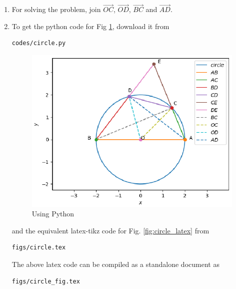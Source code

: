 \begin{enumerate}[label=\thesection.\arabic*.,ref=\thesection.\theenumi]
%
%
\item For solving the problem, join $\vec{OC}$, $\vec{OD}$, $\vec{BC}$ and $\vec{AD}$.
\item To get the python code for Fig \ref{fig:circle_python}, download it from
\begin{lstlisting}
codes/circle.py
\end{lstlisting}
\begin{figure}[!ht]
\centering
\includegraphics[width= \columnwidth]{Figure_1.eps}
\caption{Using Python}
\label{fig:circle_python}
\end{figure}
%
and the equivalent latex-tikz code for Fig. \ref{fig:circle_latex} from
\begin{lstlisting}
figs/circle.tex
\end{lstlisting}
%
The above latex code can be compiled as a standalone document as
\begin{lstlisting}
figs/circle_fig.tex
\end{lstlisting}



\end{enumerate}